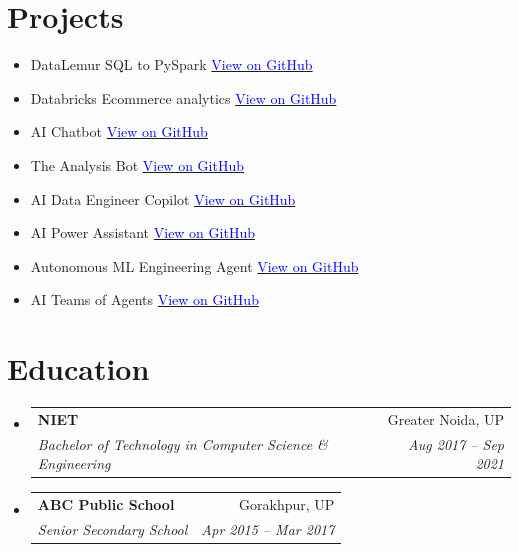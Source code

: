 \documentclass[letterpaper,11pt]{article}
\makeatletter
\newcommand{\resumeSubheading}[4]{
  \vspace{-2pt}\item
    \begin{tabular*}{0.97\textwidth}[t]{l@{\extracolsep{\fill}}r}
      \textbf{#1} & #2 \\
      \textit{\small#3} & \textit{\small #4} \\
    \end{tabular*}\vspace{-7pt}
}
\newcommand{\resumeSubHeadingListStart}{\begin{itemize}[leftmargin=0.15in, label={}]}
\newcommand{\resumeSubHeadingListEnd}{\end{itemize}}
\makeatother
\begin{document}
\section{Projects}
  \begin{itemize}[leftmargin=0.15in, label={}, itemsep=0pt, parsep=0pt, topsep=0pt]
    \item{DataLemur SQL to PySpark \hfill
    \href{https://github.com/himanshuclub88/DatalemurSQL_usingPYSPARK}{\textcolor{blue}{View on GitHub \faExternalLink}}}
    \item{Databricks Ecommerce analytics \hfill
    \href{https://github.com/himanshuclub88/DATABRICKS-ECOMMERCE_ANALYTICS_DASHBOARDS}{\textcolor{blue}{View on GitHub \faExternalLink}}}
    \item{AI Chatbot \hfill
    \href{https://github.com/himanshuclub88/Chatbot}{\textcolor{blue}{View on GitHub \faExternalLink}}}
    \item{The Analysis Bot \hfill
    \href{https://github.com/himanshuclub88/The_Analysis_Bot}{\textcolor{blue}{View on GitHub \faExternalLink}}}
    \item{ AI Data Engineer Copilot \hfill
    \href{https://github.com/himanshuclub88/ai_data_engineering_copilot}{\textcolor{blue}{View on GitHub \faExternalLink}}}
    \item{AI Power Assistant \hfill
    \href{https://github.com/himanshuclub88/job-agent}{\textcolor{blue}{View on GitHub \faExternalLink}}}
    \item{Autonomous ML Engineering Agent \hfill
    \href{https://github.com/himanshuclub88/AutonomousML}{\textcolor{blue}{View on GitHub \faExternalLink}}}
    \item{AI Teams of Agents \hfill
    \href{https://github.com/himanshuclub88/AI_TEAM}{\textcolor{blue}{View on GitHub \faExternalLink}}}
  \end{itemize}


\section{Education}
  \resumeSubHeadingListStart
    \resumeSubheading
      {NIET}{Greater Noida, UP}
      {Bachelor of Technology in Computer Science \& Engineering}{Aug 2017 -- Sep 2021}
    \resumeSubheading
      {ABC Public School}{Gorakhpur, UP}
      {Senior Secondary School}{Apr 2015 -- Mar 2017}

  \resumeSubHeadingListEnd


 
\end{document}

